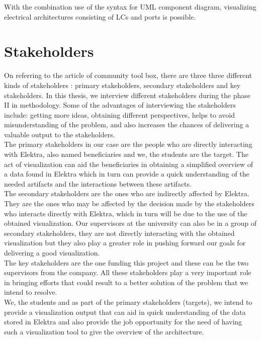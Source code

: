 With the combination use of the syntax for UML component diagram, visualizing electrical architectures consisting of LCs and ports is possible.


\section{Stakeholders}
On referring to the article of community tool box, there are three three different kinds of stakeholders : primary stakeholders, secondary stakeholders and key stakeholders. In this thesis, we interview different stakeholders during the phase II in methodology. Some of the advantages of interviewing the stakeholders include: getting more ideas, obtaining different perspectives, helps to avoid misunderstanding of the problem, and also increases the chances of delivering a valuable output to the stakeholders.\\

The primary stakeholders in our case are the people who are directly interacting with Elektra, also named beneficiaries and we, the students are the target. The act of visualization can aid the beneficiaries in obtaining a simplified overview of a data found in Elektra which in turn can provide a quick understanding of the needed artifacts and the interactions between these artifacts. \\

The secondary stakeholders are the ones who are indirectly affected by Elektra. They are the ones who may be affected by the decision made by the stakeholders who interacts directly with Elektra, which in turn will be due to the use of the obtained visualization. Our supervisors at the university can also be in a group of secondary stakeholders, they are not directly interacting with the obtained visualization but they also play a greater role in pushing forward our goals for delivering a good visualization. \\

The key stakeholders are the one funding this project and these can be the two supervisors from the company. All these stakeholders play a very important role in bringing efforts that could result to a better solution of the problem that we intend to resolve.\\

We, the students and as part of the primary stakeholders (targets), we intend to provide a visualization output that can aid in quick understanding of the data stored in Elektra and also provide the job opportunity for the need of having such a visualization tool to give the overview of the architecture. \\

